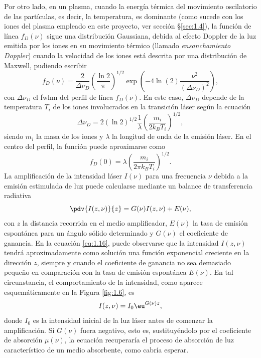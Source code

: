 Por otro lado, en un plasma, cuando la energía térmica del movimiento oscilatorio de las partículas, es decir, la temperatura, es dominante (como sucede con los iones del plasma empleado en este proyecto, ver sección \S\ref{sec:1.4}), la función de línea $f_{D}(\nu)$ sigue una distribución Gaussiana, debida al efecto Doppler de la luz emitida por los iones en su movimiento térmico (llamado \emph{ensanchamiento Doppler})  cuando la velocidad de los iones está descrita por una distribución de Maxwell, pudiendo escribir \autocite{Tallents2003,Milonni1988,Oliva2010}
\begin{equation}\label{eq:1.13}
f_{D}(\nu) = \frac{2}{\Delta \nu_{D}} \left(\frac{\ln 2}{\pi}\right)^{1/2} \exp \left(-4 \ln(2) \frac{\nu^{2}}{(\Delta \nu_{D})^{2}}\right),
\end{equation}
con $\Delta \nu_{D}$ el \acrshort{fwhm} del perfil de línea $f_{D}(\nu)$. En este caso, $\Delta \nu_{D}$ depende de la temperatura $T_{i}$ de los iones involucrados en la transición láser según la ecuación
\begin{equation}\label{eq:1.14}
  \Delta \nu_{D} = 2(\ln 2)^{1/2} \frac{1}{\lambda}\left(\frac{m_{i}}{2k_{B}T_{i}}\right)^{1/2},
\end{equation}
siendo $m_{i}$ la masa de los iones y $\lambda$ la longitud de onda de la emisión láser. En el centro del perfil, la función puede aproximarse como
\begin{equation}\label{eq:1.15}
  f_{D}(0) = \lambda \left(\frac{m_{i}}{2 \pi k_{B}T_{i}}\right)^{1/2}.
\end{equation}
La amplificación de la intensidad láser $I(\nu)$ para una frecuencia $\nu$ debida a la emisión estimulada de luz puede calcularse mediante un balance de transferencia radiativa \autocite{Milonni1988}
\begin{equation}\label{eq:1.16}
  \pdv{I(z,\nu)}{z} = G(\nu)I(z,\nu) + E(\nu),
\end{equation}
con $z$ la distancia recorrida en el medio amplificador, $E(\nu)$ la tasa de emisión espontánea para un ángulo sólido determinado y $G(\nu)$ el coeficiente de ganancia. En la ecuación \eqref{eq:1.16}, puede observarse que la intensidad $I(z,\nu)$ tendrá aproximadamente como solución una función exponencial creciente en la dirección $z$, siempre y cuando el coeficiente de ganancia no sea demasiado pequeño en comparación con la tasa de emisión espontánea $E(\nu)$. En tal circunstancia, el comportamiento de la intensidad, como aparece esquemáticamente en la Figura \ref{fig:1.6}, es
\begin{equation}\label{eq:1.17}
  I(z,\nu) = I_{0}\eu^{G(\nu)z},
\end{equation}
donde $I_{0}$ es la intensidad inicial de la luz láser antes de comenzar la amplificación. Si $G(\nu)$ fuera negativo, esto es, sustituyéndolo por el coeficiente de absorción $\mu(\nu)$, la ecuación recuperaría el proceso de absorción de luz característico de un medio absorbente, como cabría esperar. 

